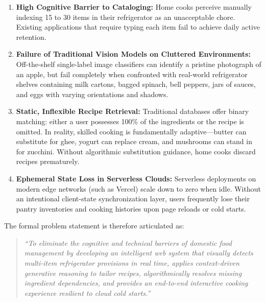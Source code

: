 \begin{enumerate}
    \item \textbf{High Cognitive Barrier to Cataloging:} Home cooks perceive manually indexing 15 to 30 items in their refrigerator as an unacceptable chore. Existing applications that require typing each item fail to achieve daily active retention.
    \item \textbf{Failure of Traditional Vision Models on Cluttered Environments:} Off-the-shelf single-label image classifiers can identify a pristine photograph of an apple, but fail completely when confronted with real-world refrigerator shelves containing milk cartons, bagged spinach, bell peppers, jars of sauces, and eggs with varying orientations and shadows.
    \item \textbf{Static, Inflexible Recipe Retrieval:} Traditional databases offer binary matching: either a user possesses 100\% of the ingredients or the recipe is omitted. In reality, skilled cooking is fundamentally adaptive—butter can substitute for ghee, yogurt can replace cream, and mushrooms can stand in for zucchini. Without algorithmic substitution guidance, home cooks discard recipes prematurely.
    \item \textbf{Ephemeral State Loss in Serverless Clouds:} Serverless deployments on modern edge networks (such as Vercel) scale down to zero when idle. Without an intentional client-state synchronization layer, users frequently lose their pantry inventories and cooking histories upon page reloads or cold starts.
\end{enumerate}

The formal problem statement is therefore articulated as:
\begin{quote}
\textit{“To eliminate the cognitive and technical barriers of domestic food management by developing an intelligent web system that visually detects multi-item refrigerator provisions in real time, applies context-driven generative reasoning to tailor recipes, algorithmically resolves missing ingredient dependencies, and provides an end-to-end interactive cooking experience resilient to cloud cold starts.”}
\end{quote}

